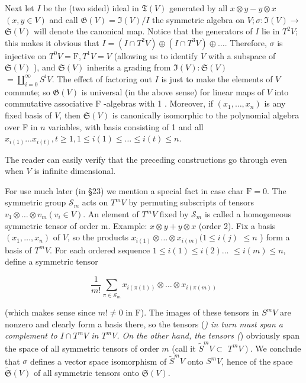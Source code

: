 \documentclass[10pt]{article}
\begin{document}
Next let $I$ be the (two sided) ideal in $\mathfrak{T}(V)$ generated by all $x \otimes y-y \otimes x$ $(x, y \in V)$ and call $\mathfrak{G}(V)=\mathfrak{I}(V) / I$ the symmetric algebra on $V ; \sigma: \mathfrak{I}(V) \rightarrow$ $\mathfrak{S}(V)$ will denote the canonical map. Notice that the generators of $I$ lie in $T^{2} V$; this makes it obvious that $I=\left(I \cap T^{2} V\right) \oplus\left(I \cap T^{3} V\right) \oplus \ldots$. Therefore, $\sigma$ is injective on $T^{0} V=\mathrm{F}, T^{1} V=V$ (allowing us to identify $V$ with a subspace of $\mathfrak{S}(V)$ ), and $\mathfrak{S}(V)$ inherits a grading from $\mathfrak{I}(V): \mathfrak{S}(V)$\\
$=\coprod_{i=0}^{\infty} S^{i} V$. The effect of factoring out $I$ is just to make the elements of $V$ commute; so $\mathfrak{G}(V)$ is universal (in the above sense) for linear maps of $V$ into commutative associative F -algebras with 1 . Moreover, if $\left(x_{1}, \ldots, x_{n}\right)$ is any fixed basis of $V$, then $\mathfrak{S}(V)$ is canonically isomorphic to the polynomial algebra over F in $n$ variables, with basis consisting of 1 and all $x_{i(1)} \ldots x_{i(t)}, t \geq 1,1 \leq i(1) \leq \ldots \leq i(t) \leq n$.

The reader can easily verify that the preceding constructions go through even when $V$ is infinite dimensional.

For use much later (in §23) we mention a special fact in case char $\mathrm{F}=0$. The symmetric group $\mathscr{S}_{m}$ acts on $T^{m} V$ by permuting subscripts of tensors $v_{1} \otimes \ldots \otimes v_{m}\left(v_{i} \in V\right)$. An element of $T^{m} V$ fixed by $\mathscr{S}_{m}$ is called a homogeneous symmetric tensor of order m. Example: $x \otimes y+y \otimes x$ (order 2). Fix a basis $\left(x_{1}, \ldots, x_{n}\right)$ of $V$, so the products $x_{i(1)} \otimes \ldots \otimes x_{i(m)}(1 \leq i(j)$ $\leq n$ ) form a basis of $T^{m} V$. For each ordered sequence $1 \leq i(1) \leq i(2) \ldots$ $\leq i(m) \leq n$, define a symmetric tensor


\begin{equation*}
\frac{1}{m!} \sum_{\pi \in \mathscr{S}_{m}} x_{i(\pi(1))} \otimes \ldots \otimes x_{i(\pi(m))} \tag{*}
\end{equation*}


(which makes sense since $m!\neq 0$ in F). The images of these tensors in $S^{m} V$ are nonzero and clearly form a basis there, so the tensors (\textit{) in turn must span a complement to $I \cap T^{m} V$ in $T^{m} V$. On the other hand, the tensors (}) obviously span the space of all symmetric tensors of order $m$ (call it $\tilde{S}^{m} V \subset$ $\left.T^{m} V\right)$. We conclude that $\sigma$ defines a vector space isomorphism of $\widetilde{S}^{m} V$ onto $S^{m} V$, hence of the space $\widetilde{\mathfrak{S}}(V)$ of all symmetric tensors onto $\mathfrak{S}(V)$.
\end{document}
